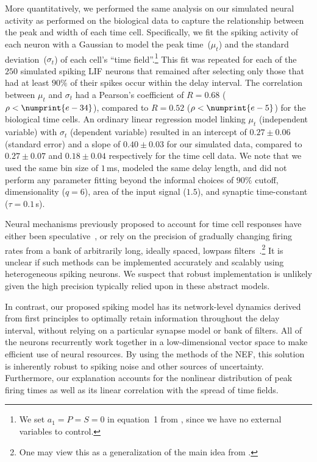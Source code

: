 More quantitatively, we performed the same analysis on our simulated neural activity as \citet{tiganj2016sequential} performed on the biological data to capture the relationship between the peak and width of each time cell.
Specifically, we fit the spiking activity of each neuron with a Gaussian to model the peak time~($\mu_t$) and the standard deviation~($\sigma_t$) of each cell's ``time field''.\footnote{%
We set $a_1 = P = S = 0$ in equation~1 from \citet{tiganj2016sequential}, since we have no external variables to control.
}
This fit was repeated for each of the $250$ simulated spiking LIF neurons that remained after selecting only those that had at least $90\%$ of their spikes occur within the delay interval.
The correlation between $\mu_t$ and $\sigma_t$ had a Pearson's coefficient of $R = 0.68$ ($\rho < \numprint{e-34}$), compared to $R = 0.52$ ($\rho < \numprint{e-5}$) for the biological time cells.
An ordinary linear regression model linking $\mu_t$ (independent variable) with $\sigma_t$ (dependent variable) resulted in an intercept of $0.27 \pm 0.06$ (standard error) and a slope of $0.40 \pm 0.03$ for our simulated data, compared to $0.27 \pm 0.07$ and $0.18 \pm 0.04$ respectively for the time cell data.
We note that we used the same bin size of $1$\,ms, modeled the same delay length, and did not perform any parameter fitting beyond the informal choices of $90\%$ cutoff, dimensionality ($q=6$), area of the input signal ($1.5$), and synaptic time-constant ($\tau = 0.1$\,s).

Neural mechanisms previously proposed to account for time cell responses have either been speculative~\citep{tiganj2016sequential},
or rely on the precision of gradually changing firing rates from a bank of arbitrarily long, ideally spaced, lowpass filters~\citep{shankar2012scale, howard2014unified, tiganj2015simple, tiganj2017neural, zoran2018}.\footnote{%
One may view this as a generalization of the main idea from \citet{goldman2009memory}.
}
It is unclear if such methods can be implemented accurately and scalably using heterogeneous spiking neurons.
We suspect that robust implementation is unlikely given the high precision typically relied upon in these abstract models.

In contrast, our proposed spiking model has its network-level dynamics derived from first principles to optimally retain information throughout the delay interval, without relying on a particular synapse model or bank of filters.
All of the neurons recurrently work together in a low-dimensional vector space to make efficient use of neural resources.
By using the methods of the NEF, this solution is inherently robust to spiking noise and other sources of uncertainty.
Furthermore, our explanation accounts for the nonlinear distribution of peak firing times as well as its linear correlation with the spread of time fields.

